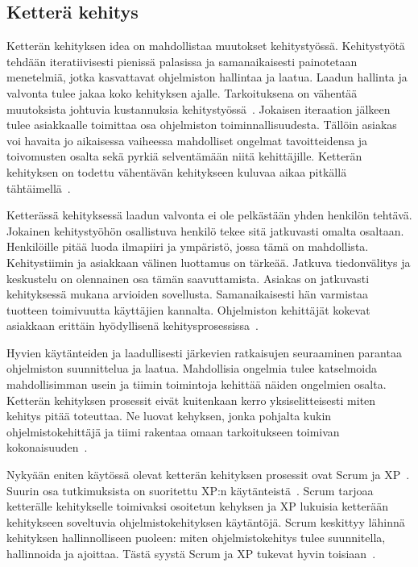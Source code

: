 \documentclass[finnish]{../tktltiki2}
\theoremstyle{definition}
\theoremstyle{remark}
\begin{document}
\subsection{Ketterä kehitys}

Ketterän kehityksen idea on mahdollistaa muutokset kehitystyössä. Kehitystyötä tehdään iteratiivisesti pienissä 
palasissa ja samanaikaisesti painotetaan menetelmiä, jotka kasvattavat ohjelmiston hallintaa ja laatua. Laadun hallinta 
ja valvonta tulee jakaa koko kehityksen ajalle. Tarkoituksena on vähentää muutoksista johtuvia kustannuksia 
kehitystyössä~\cite{HC01}. Jokaisen iteraation jälkeen tulee asiakkaalle toimittaa osa ohjelmiston 
toiminnallisuudesta. Tällöin asiakas voi havaita jo aikaisessa vaiheessa mahdolliset ongelmat tavoitteidensa ja 
toivomusten osalta sekä pyrkiä selventämään niitä kehittäjille. Ketterän kehityksen on todettu vähentävän kehitykseen 
kuluvaa aikaa pitkällä tähtäimellä~\cite{HC01}.

    Ketterässä kehityksessä laadun valvonta ei ole pelkästään yhden henkilön tehtävä. Jokainen kehitystyöhön osallistuva 
henkilö tekee sitä jatkuvasti omalta osaltaan. Henkilöille pitää luoda ilmapiiri ja ympäristö, jossa tämä on 
mahdollista. Kehitystiimin ja asiakkaan välinen luottamus on tärkeää. Jatkuva tiedonvälitys ja keskustelu on olennainen 
osa tämän saavuttamista. Asiakas on jatkuvasti kehityksessä mukana arvioiden sovellusta. Samanaikaisesti hän varmistaa 
tuotteen toimivuutta käyttäjien kannalta. Ohjelmiston kehittäjät kokevat asiakkaan erittäin hyödyllisenä 
kehitysprosessissa~\cite{DD08}.

    Hyvien käytänteiden ja laadullisesti järkevien ratkaisujen seuraaminen parantaa ohjelmiston suunnittelua ja laatua. 
Mahdollisia ongelmia tulee katselmoida mahdollisimman usein ja tiimin toimintoja kehittää näiden ongelmien osalta. 
Ketterän kehityksen prosessit eivät kuitenkaan kerro yksiselitteisesti miten kehitys pitää toteuttaa. Ne luovat 
kehyksen, jonka pohjalta kukin ohjelmistokehittäjä ja tiimi rakentaa omaan tarkoitukseen toimivan 
kokonaisuuden~\cite{Kn07}.

    Nykyään eniten käytössä olevat ketterän kehityksen prosessit ovat Scrum ja XP~\cite{SS10}. Suurin osa tutkimuksista on 
suoritettu XP:n käytänteistä~\cite{DD08}. Scrum tarjoaa ketterälle kehitykselle toimivaksi osoitetun kehyksen ja XP 
lukuisia ketterään kehitykseen soveltuvia ohjelmistokehityksen käytäntöjä. Scrum keskittyy lähinnä kehityksen 
hallinnolliseen puoleen: miten ohjelmistokehitys tulee suunnitella, hallinnoida ja ajoittaa. Tästä syystä Scrum ja XP 
tukevat hyvin toisiaan~\cite{Kn07}.
\end{document}
